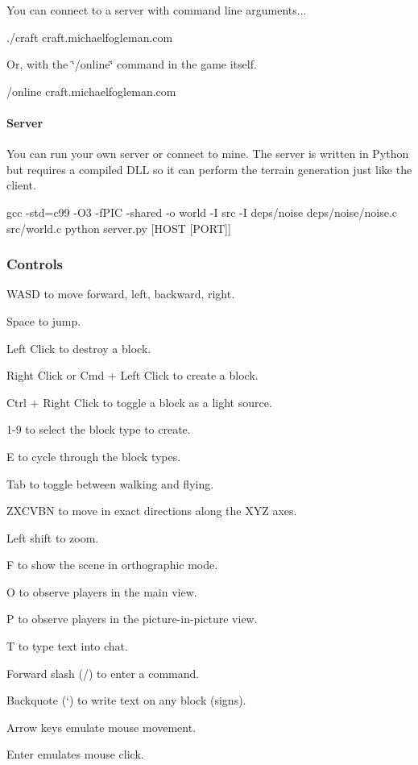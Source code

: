 You can connect to a server with command line arguments... \begin{DoxyVerb}./craft craft.michaelfogleman.com
\end{DoxyVerb}


Or, with the \char`\"{}/online\char`\"{} command in the game itself. \begin{DoxyVerb}/online craft.michaelfogleman.com
\end{DoxyVerb}


\paragraph*{Server}

You can run your own server or connect to mine. The server is written in Python but requires a compiled D\+LL so it can perform the terrain generation just like the client. \begin{DoxyVerb}gcc -std=c99 -O3 -fPIC -shared -o world -I src -I deps/noise deps/noise/noise.c src/world.c
python server.py [HOST [PORT]]
\end{DoxyVerb}


\subsubsection*{Controls}


\begin{DoxyItemize}
\item W\+A\+SD to move forward, left, backward, right.
\item Space to jump.
\item Left Click to destroy a block.
\item Right Click or Cmd + Left Click to create a block.
\item Ctrl + Right Click to toggle a block as a light source.
\item 1-\/9 to select the block type to create.
\item E to cycle through the block types.
\item Tab to toggle between walking and flying.
\item Z\+X\+C\+V\+BN to move in exact directions along the X\+YZ axes.
\item Left shift to zoom.
\item F to show the scene in orthographic mode.
\item O to observe players in the main view.
\item P to observe players in the picture-\/in-\/picture view.
\item T to type text into chat.
\item Forward slash (/) to enter a command.
\item Backquote (`) to write text on any block (signs).
\item Arrow keys emulate mouse movement.
\item Enter emulates mouse click.
\end{DoxyItemize}


